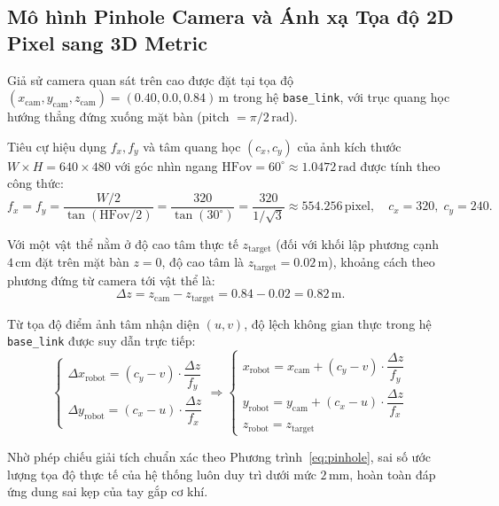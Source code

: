 \documentclass[a4paper,12pt]{article}
\begin{document}
\subsection{Mô hình Pinhole Camera và Ánh xạ Tọa độ 2D Pixel sang 3D Metric}
Giả sử camera quan sát trên cao được đặt tại tọa độ $(x_{\text{cam}}, y_{\text{cam}}, z_{\text{cam}}) = (0.40, 0.0, 0.84)\,\text{m}$ trong hệ \texttt{base\_link}, với trục quang học hướng thẳng đứng xuống mặt bàn (pitch $= \pi/2\,\text{rad}$).

Tiêu cự hiệu dụng $f_x, f_y$ và tâm quang học $(c_x, c_y)$ của ảnh kích thước $W \times H = 640 \times 480$ với góc nhìn ngang $\text{HFov} = 60^\circ \approx 1.0472\,\text{rad}$ được tính theo công thức:
\begin{equation}
f_x = f_y = \frac{W / 2}{\tan(\text{HFov} / 2)} = \frac{320}{\tan(30^\circ)} = \frac{320}{1/\sqrt{3}} \approx 554.256\,\text{pixel}, \quad c_x = 320, \; c_y = 240.
\end{equation}

Với một vật thể nằm ở độ cao tâm thực tế $z_{\text{target}}$ (đối với khối lập phương cạnh $4\,\text{cm}$ đặt trên mặt bàn $z=0$, độ cao tâm là $z_{\text{target}} = 0.02\,\text{m}$), khoảng cách theo phương đứng từ camera tới vật thể là:
\begin{equation}
\Delta z = z_{\text{cam}} - z_{\text{target}} = 0.84 - 0.02 = 0.82\,\text{m}.
\end{equation}

Từ tọa độ điểm ảnh tâm nhận diện $(u, v)$, độ lệch không gian thực trong hệ \texttt{base\_link} được suy dẫn trực tiếp:
\begin{equation}
\begin{cases}
\Delta x_{\text{robot}} = (c_y - v) \cdot \dfrac{\Delta z}{f_y} \\
\Delta y_{\text{robot}} = (c_x - u) \cdot \dfrac{\Delta z}{f_x}
\end{cases}
\Longrightarrow
\begin{cases}
x_{\text{robot}} = x_{\text{cam}} + (c_y - v) \cdot \dfrac{\Delta z}{f_y} \\[0.2cm]
y_{\text{robot}} = y_{\text{cam}} + (c_x - u) \cdot \dfrac{\Delta z}{f_x} \\[0.2cm]
z_{\text{robot}} = z_{\text{target}}
\end{cases}
\label{eq:pinhole}
\end{equation}

Nhờ phép chiếu giải tích chuẩn xác theo Phương trình~\eqref{eq:pinhole}, sai số ước lượng tọa độ thực tế của hệ thống luôn duy trì dưới mức $2\,\text{mm}$, hoàn toàn đáp ứng dung sai kẹp của tay gắp cơ khí.
\end{document}
